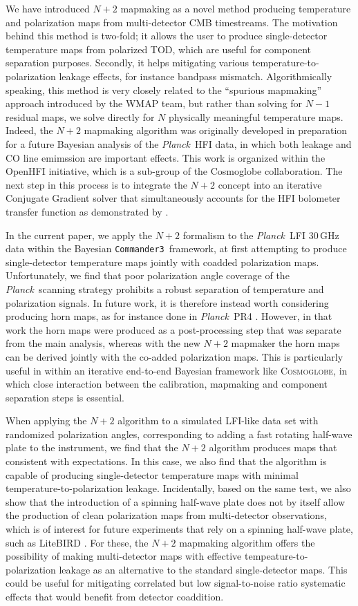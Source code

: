 \documentclass{aa}
\def\commanderthree{\texttt{Commander3}}
\newcommand{\Cosmoglobe}{\textsc{Cosmoglobe}}
\def\Cosmoglobe{\textsc{Cosmoglobe}}
\def\Planck{\textit{Planck}}
\begin{document}
We have introduced $N+2$ mapmaking as a novel method producing temperature and polarization maps from multi-detector CMB timestreams. The motivation behind this method is two-fold; it allows the user to produce single-detector temperature maps from polarized TOD, which are useful for component separation purposes. Secondly, it helps mitigating various temperature-to-polarization leakage effects, for instance bandpass mismatch. Algorithmically speaking, this method is very closely related to the ``spurious mapmaking'' approach introduced by the WMAP team, but rather than solving for $N-1$ residual maps, we solve directly for $N$ physically meaningful temperature maps. Indeed, the $N+2$ mapmaking algorithm was originally developed in preparation for a future Bayesian analysis of the \Planck\ HFI data, in which both leakage and CO line emimssion are important effects. This work is organized within the OpenHFI initiative, which is a sub-group of the Cosmoglobe collaboration. The next step in this process is to integrate the $N+2$ concept into an iterative Conjugate Gradient solver that simultaneously accounts for the HFI bolometer transfer function as demonstrated by \cite{artem}. 

In the current paper, we apply the $N+2$ formalism to the \Planck\ LFI 30\,GHz data within the Bayesian \commanderthree\ framework, at first attempting to produce single-detector temperature maps jointly with coadded polarization maps. Unfortunately, we find that poor polarization angle coverage of the \Planck\ scanning strategy prohibits a robust separation of temperature and polarization signals. In future work, it is therefore instead worth considering producing horn maps, as for instance done in \Planck\ PR4 \citep{npipe}. However, in that work the horn maps were produced as a post-processing step that was separate from the main analysis, whereas with the new $N+2$ mapmaker the horn maps can be derived jointly with the co-added polarization maps. This is particularly useful in within an iterative end-to-end Bayesian framework like \Cosmoglobe, in which close interaction between the calibration, mapmaking and component separation steps is essential.    

When applying the $N+2$ algorithm to a simulated LFI-like data set with randomized polarization angles, corresponding to adding a fast rotating half-wave plate to the instrument, we find that the $N+2$ algorithm produces maps that consistent with expectations. In this case, we also find that the algorithm is capable of producing single-detector temperature maps with minimal temperature-to-polarization leakage. Incidentally, based on the same test, we also show that the introduction of a spinning half-wave plate does not by itself allow the production of clean polarization maps from multi-detector observations, which is of interest for future experiments that rely on a spinning half-wave plate, such as LiteBIRD \citep{ptep}. For these, the $N+2$ mapmaking algorithm offers the possibility of making multi-detector maps with effective tempeature-to-polarization leakage as an alternative to the standard single-detector maps. This could be useful for mitigating correlated but low signal-to-noise ratio systematic effects that would benefit from detector coaddition. 
\end{document}
